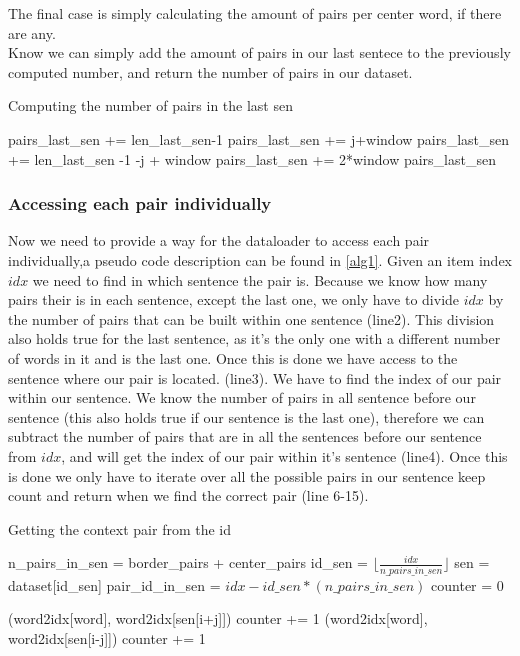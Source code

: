 The final case is simply calculating the amount of pairs per center word, if there are any. \\
Know we can simply add the amount of pairs in our last sentece to the previously computed number, and return the number of pairs in our dataset.
\begin{algorithm}[h]
\caption{Computing the number of pairs in the last sen}
\label{alg2}
\begin{algorithmic}[1]
\STATE pairs\_last\_sen += len\_last\_sen-1
\ELSE
\STATE pairs\_last\_sen += j+window
\ENDIF
{}
\STATE pairs\_last\_sen += len\_last\_sen -1 -j + window
\ELSE
\STATE pairs\_last\_sen += 2*window
\ENDIF
\ENDFOR
\RETURN pairs\_last\_sen
\end{algorithmic}
\end{algorithm}

 \subsubsection{Accessing each pair individually}
Now we need to provide a way for the dataloader to access each pair individually,a pseudo code description can be found in \ref{alg1}. 
Given an item index $idx$ we need to find in which sentence the pair is. Because we know  how many pairs their is in each sentence, except the last one, we only have to divide $idx$ by the number of pairs that can be built within one sentence (line2). This division also holds true for the last sentence, as it's the only one with a different number of words in it and is the last one.  Once this is done we have access to the sentence where our pair is located. (line3). We have to find the index of our pair within our sentence. We know the number of pairs in all sentence before our sentence (this also holds true if our sentence is the last one), therefore we can subtract the number of pairs that are in all the sentences before our sentence from $idx$, and will get the index of our pair within it's sentence (line4). Once this is done we only have to iterate over all the possible pairs in our sentence keep count and return when we find the correct pair (line 6-15).
\begin{algorithm}
\caption{Getting the context pair from the id}
\label{alg1}
\begin{algorithmic}[1]

\STATE n\_pairs\_in\_sen = border\_pairs + center\_pairs
 \STATE id\_sen = $\lfloor \frac{idx}{n\_pairs\_in\_sen} \rfloor$
\STATE  sen  = dataset[id\_sen]
\STATE  pair\_id\_in\_sen = $idx - id\_sen*(n\_pairs\_in\_sen)$
\STATE counter = 0

\RETURN (word2idx[word], word2idx[sen[i+j]])
\ENDIF
\STATE counter += 1
\ENDIF
{}
\RETURN (word2idx[word], word2idx[sen[i-j]])
\ENDIF
\STATE counter += 1
\ENDIF
\ENDFOR
\ENDFOR
\end{algorithmic}
\end{algorithm}

